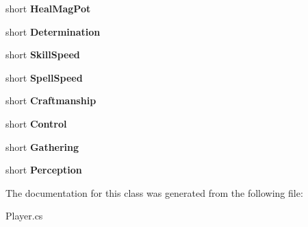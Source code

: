 \begin{DoxyCompactItemize}
\item 
\hypertarget{classffxivlib_1_1_player_ad5c8c53dc119ee208c95c048b6dcd508}{short {\bfseries Heal\-Mag\-Pot}}\label{classffxivlib_1_1_player_ad5c8c53dc119ee208c95c048b6dcd508}

\item 
\hypertarget{classffxivlib_1_1_player_aa05831c25dfe876cea719af2764dbbf5}{short {\bfseries Determination}}\label{classffxivlib_1_1_player_aa05831c25dfe876cea719af2764dbbf5}

\item 
\hypertarget{classffxivlib_1_1_player_aa5ee010801631934cdd775422e68885d}{short {\bfseries Skill\-Speed}}\label{classffxivlib_1_1_player_aa5ee010801631934cdd775422e68885d}

\item 
\hypertarget{classffxivlib_1_1_player_a3aaf30777aa4c0a4dfbd97a023e37b7b}{short {\bfseries Spell\-Speed}}\label{classffxivlib_1_1_player_a3aaf30777aa4c0a4dfbd97a023e37b7b}

\item 
\hypertarget{classffxivlib_1_1_player_ae7aca8044efa1f3c2c9e0fb2afbb30a3}{short {\bfseries Craftmanship}}\label{classffxivlib_1_1_player_ae7aca8044efa1f3c2c9e0fb2afbb30a3}

\item 
\hypertarget{classffxivlib_1_1_player_a123076f7b11fdad1d1a6eb6af56e717e}{short {\bfseries Control}}\label{classffxivlib_1_1_player_a123076f7b11fdad1d1a6eb6af56e717e}

\item 
\hypertarget{classffxivlib_1_1_player_a2bed1d1b5433c3b099f8b53957a5053b}{short {\bfseries Gathering}}\label{classffxivlib_1_1_player_a2bed1d1b5433c3b099f8b53957a5053b}

\item 
\hypertarget{classffxivlib_1_1_player_aea71f5495b53bd41118fa3b97efaa06d}{short {\bfseries Perception}}\label{classffxivlib_1_1_player_aea71f5495b53bd41118fa3b97efaa06d}

\end{DoxyCompactItemize}


The documentation for this class was generated from the following file\-:\begin{DoxyCompactItemize}
\item 
Player.\-cs\end{DoxyCompactItemize}
